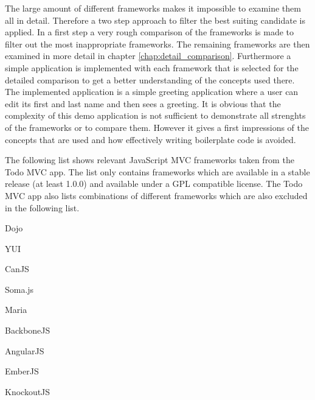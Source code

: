 The large amount of different frameworks makes it impossible to examine them all in detail.
Therefore a two step approach to filter the best suiting candidate is applied.
In a first step a very rough comparison of the frameworks is made to filter out the most inappropriate frameworks.
The remaining frameworks are then examined in more detail in chapter \ref{chap:detail_comparison}.
Furthermore a simple application is implemented with each framework that is selected for the detailed comparison to get a better understanding of the concepts used there.
The implemented application is a simple greeting application where a user can edit its first and last name and then sees a greeting. 
It is obvious that the complexity of this demo application is not sufficient to demonstrate all strenghts of the frameworks or to compare them. However it gives a first impressions of the concepts that are used and how effectively writing boilerplate code is avoided.

   
The following list shows relevant JavaScript MVC frameworks taken from the Todo MVC app.
The list only contains frameworks which are available in a stable release (at least 1.0.0) and available under a GPL compatible license.
The Todo MVC app also lists combinations of different frameworks which are also excluded in the following list.\\

\begin{itemize}
\begin{minipage}{0.5\textwidth}

	\item Dojo
	\item YUI
	\item CanJS
	\item Soma.js
	\item Maria
\end{minipage}
\begin{minipage}{0.5\textwidth}

	\item BackboneJS
	\item AngularJS
	\item EmberJS
	\item KnockoutJS
	\end{minipage}
\end{itemize}


